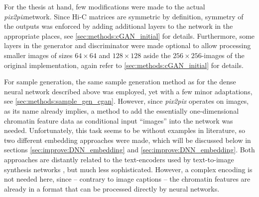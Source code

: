 For the thesis at hand, few modifications were made to the actual \emph{pix2pix}network.
Since Hi-C matrices are symmetric by definition, symmetry of the outputs was enforced
by adding additional layers to the network in the appropriate places, see \cref{sec:methods:cGAN_initial} for details.
Furthermore, some layers in the generator and discriminator were made optional to allow processing smaller images of sizes $64\times64$
and $128\times128$ aside the $256\times256$-images of the original implementation, again refer to \cref{sec:methods:cGAN_initial} for details.

For sample generation, the same sample generation method as for the dense neural network described above was employed, 
yet with a few minor adaptations, see \cref{sec:methods:sample_gen_cgan}.
However, since \emph{pix2pix} operates on images, as its name already implies, 
a method to add the essentially one-dimensional chromatin feature data as conditional input ``images'' into the network was needed.
Unfortunately, this task seems to be without examples in literature, so two different embedding approaches were made,
which will be discussed below in sections \ref{sec:improve:DNN_embedding} and \ref{sec:improve:DNN_embedding}.
Both approaches are distantly related to the text-encoders used by text-to-image synthesis networks 
\cite{Reed2016b,Xu2018}, but much less sophisticated. 
However, a complex encoding is not needed here, since -- contrary to image captions -- the chromatin features are already in a format that can be processed directly by neural networks.

